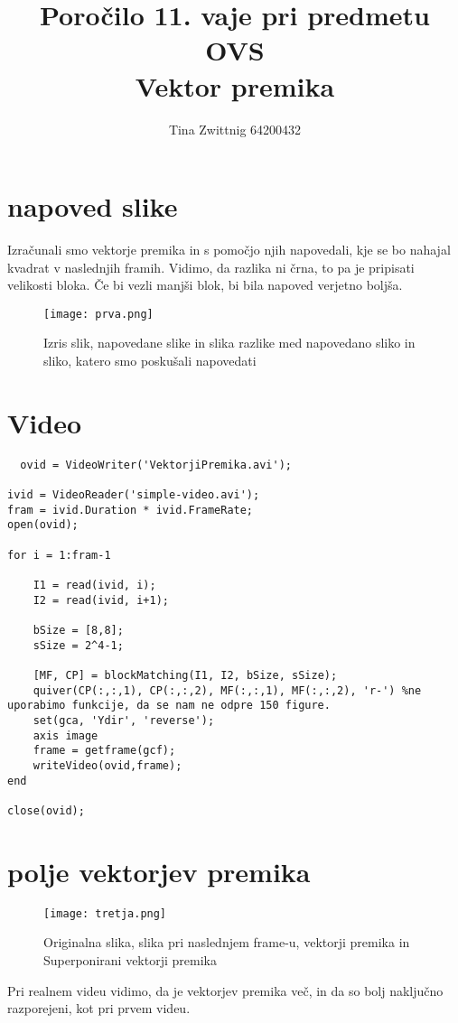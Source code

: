 \documentclass[12pt,a4paper]{article}
\author{Tina Zwittnig 64200432}
\title{Poročilo 11. vaje pri predmetu OVS \\ Vektor premika}
\begin{document}
\maketitle
\pagebreak
\section{napoved slike}
Izračunali smo vektorje premika in s pomočjo njih napovedali, kje se bo nahajal kvadrat v naslednjih framih. Vidimo, da razlika ni črna, to pa je pripisati velikosti bloka. Če bi vezli manjši blok, bi bila napoved verjetno boljša.
\begin{figure}[h!]
  \begin{center}
    \texttt{[image: prva.png]}
    \caption{Izris slik, napovedane slike in slika razlike med napovedano sliko in sliko, katero smo poskušali napovedati}
    \label{fig:}
  \end{center}
\end{figure}
\pagebreak
\section{Video}
\begin{verbatim}
  ovid = VideoWriter('VektorjiPremika.avi');

ivid = VideoReader('simple-video.avi');
fram = ivid.Duration * ivid.FrameRate;
open(ovid);

for i = 1:fram-1

    I1 = read(ivid, i);
    I2 = read(ivid, i+1);

    bSize = [8,8];
    sSize = 2^4-1;

    [MF, CP] = blockMatching(I1, I2, bSize, sSize);
    quiver(CP(:,:,1), CP(:,:,2), MF(:,:,1), MF(:,:,2), 'r-') %ne uporabimo funkcije, da se nam ne odpre 150 figure.
    set(gca, 'Ydir', 'reverse');
    axis image
    frame = getframe(gcf);
    writeVideo(ovid,frame);
end

close(ovid);
\end{verbatim}
\pagebreak
\section{polje  vektorjev  premika}
\begin{figure}[h!]
  \begin{center}
    \texttt{[image: tretja.png]}
    \caption{Originalna slika, slika pri naslednjem frame-u, vektorji premika in Superponirani vektorji premika}
    \label{fig:}
  \end{center}
\end{figure}

Pri realnem videu vidimo, da je vektorjev premika več, in da so bolj naključno razporejeni, kot pri prvem videu. 
\end{document}
